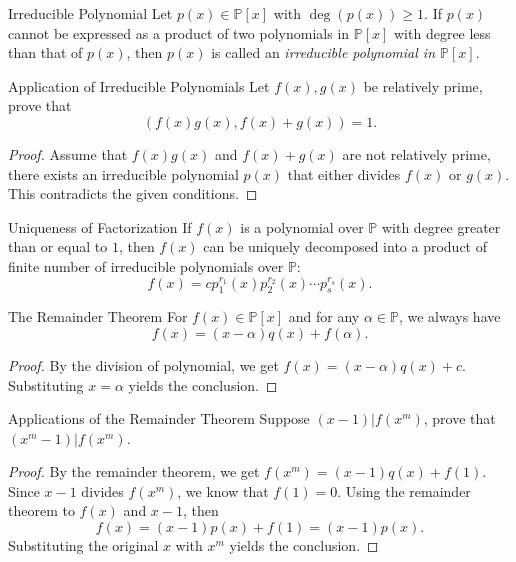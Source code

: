 \begin{definition}{Irreducible Polynomial}{}
  Let $p(x) \in \mathbb{P}[x]$ with $\operatorname{deg}(p(x)) \geq 1$.
  If $p(x)$ cannot be expressed as a product of two polynomials in
  $\mathbb{P}[x]$
  with degree less than that of $p(x)$,
  then $p(x)$ is called an \emph{irreducible polynomial in $\mathbb{P}[x]$}.
\end{definition}

\begin{example}{Application of Irreducible Polynomials}{}
  Let $f(x), g(x)$ be relatively prime, prove that
  \begin{equation}
    (f(x)g(x), f(x) + g(x)) = 1.
  \end{equation}
\end{example}

\begin{proof}
  Assume that $f(x)g(x)$ and $f(x) + g(x)$ are not relatively prime,
  there exists an irreducible polynomial $p(x)$ that either divides $f(x)$ or
  $g(x)$. This contradicts the given conditions.
\end{proof}

\begin{theorem}{Uniqueness of Factorization}{}
  If $f(x)$ is a polynomial over $\mathbb{P}$ with degree greater than or equal
  to $1$, then $f(x)$ can be uniquely decomposed into a product of finite number
  of irreducible polynomials over $\mathbb{P}$:
  \begin{equation}
    f(x) = cp_1^{r_1}(x) p_2^{r_2}(x) \cdots p_s^{r_s}(x).
  \end{equation}
\end{theorem}

\begin{theorem}{The Remainder Theorem}{}
  For $f(x) \in \mathbb{P}[x]$ and for any $\alpha \in \mathbb{P}$,
  we always have
  \begin{equation}
    f(x) = (x - \alpha)q(x) + f(\alpha).
  \end{equation}
\end{theorem}

\begin{proof}
  By the division of polynomial, we get $f(x) = (x-\alpha)q(x) + c$.
  Substituting $x = \alpha$ yields the conclusion.
\end{proof}

\begin{example}{Applications of the Remainder Theorem}{}
  Suppose $(x - 1)| f(x^m)$, prove that $(x^m - 1) | f(x^m)$.
\end{example}

\begin{proof}
  By the remainder theorem, we get $f(x^m) = (x-1)q(x) + f(1)$.
  Since $x-1$ divides $f(x^m)$, we know that $f(1) = 0$.
  Using the remainder theorem to $f(x)$ and $x-1$, then
  \begin{equation}
    f(x) = (x-1)p(x) + f(1) = (x-1)p(x).
  \end{equation}
  Substituting the original $x$ with $x^m$ yields the conclusion.
\end{proof}





